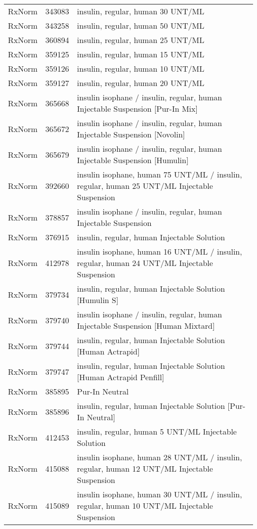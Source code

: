 \begin{longtable}{p{}p{}p{}}
  RxNorm & 343083 & insulin, regular, human 30 UNT/ML \\ 
  RxNorm & 343258 & insulin, regular, human 50 UNT/ML \\ 
  RxNorm & 360894 & insulin, regular, human 25 UNT/ML \\ 
  RxNorm & 359125 & insulin, regular, human 15 UNT/ML \\ 
  RxNorm & 359126 & insulin, regular, human 10 UNT/ML \\ 
  RxNorm & 359127 & insulin, regular, human 20 UNT/ML \\ 
  RxNorm & 365668 & insulin isophane / insulin, regular, human Injectable Suspension [Pur-In Mix] \\ 
  RxNorm & 365672 & insulin isophane / insulin, regular, human Injectable Suspension [Novolin] \\ 
  RxNorm & 365679 & insulin isophane / insulin, regular, human Injectable Suspension [Humulin] \\ 
  RxNorm & 392660 & insulin isophane, human 75 UNT/ML / insulin, regular, human 25 UNT/ML Injectable Suspension \\ 
  RxNorm & 378857 & insulin isophane / insulin, regular, human Injectable Suspension \\ 
  RxNorm & 376915 & insulin, regular, human Injectable Solution \\ 
  RxNorm & 412978 & insulin isophane, human 16 UNT/ML / insulin, regular, human 24 UNT/ML Injectable Suspension \\ 
  RxNorm & 379734 & insulin, regular, human Injectable Solution [Humulin S] \\ 
  RxNorm & 379740 & insulin isophane / insulin, regular, human Injectable Suspension [Human Mixtard] \\ 
  RxNorm & 379744 & insulin, regular, human Injectable Solution [Human Actrapid] \\ 
  RxNorm & 379747 & insulin, regular, human Injectable Solution [Human Actrapid Penfill] \\ 
  RxNorm & 385895 & Pur-In Neutral \\ 
  RxNorm & 385896 & insulin, regular, human Injectable Solution [Pur-In Neutral] \\ 
  RxNorm & 412453 & insulin, regular, human 5 UNT/ML Injectable Solution \\ 
  RxNorm & 415088 & insulin isophane, human 28 UNT/ML / insulin, regular, human 12 UNT/ML Injectable Suspension \\ 
  RxNorm & 415089 & insulin isophane, human 30 UNT/ML / insulin, regular, human 10 UNT/ML Injectable Suspension \\ 

\end{longtable}
